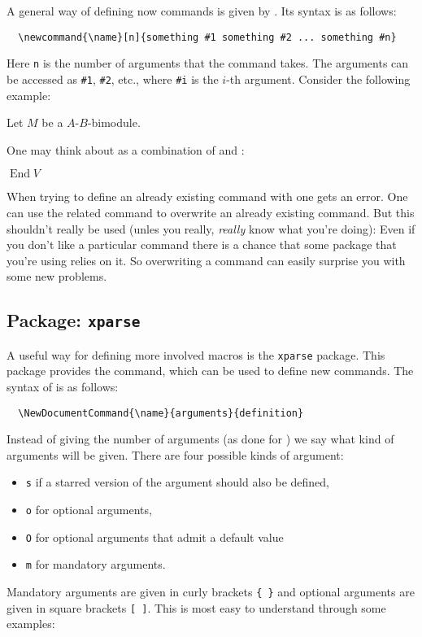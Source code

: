 \documentclass[a4paper, 10pt, abstract=on, headings=standardclasses]{scrartcl}
\begin{document}
A general way of defining now commands is given by .
Its syntax is as follows:
\begin{lstlisting}
  \newcommand{\name}[n]{something #1 something #2 ... something #n}
\end{lstlisting}
Here \texttt{n} is the number of arguments that the command takes.
The arguments can be accessed as \texttt{\#1}, \texttt{\#2}, etc., where \texttt{\#i} is the $i$-th argument.
Consider the following example:
\begin{LTXexample}[pos = b]
  \newcommand{\bimodule}[2]{#1-#2-bimodule}
  Let $M$ be a \bimodule{$A$}{$B$}.
\end{LTXexample}
One may think about  as a combination of  and :
\begin{LTXexample}[pos = b]
  \newcommand{\End}{\operatorname{End}}
  $\End V$
\end{LTXexample}

When trying to define an already existing command with  one gets an error.
One can use the related command  to overwrite an already existing command.
But this shouldn’t really be used (unles you really, \emph{really} know what you’re doing):
Even if you don’t like a particular command there is a chance that some package that you’re using relies on it.
So overwriting a command can easily surprise you with some new problems.



\subsection{Package: \texttt{xparse}}

A useful way for defining more involved macros is the \texttt{xparse} package.
This package provides the  command, which can be used to define new commands.
The syntax of  is as follows:
\begin{lstlisting}
  \NewDocumentCommand{\name}{arguments}{definition}
\end{lstlisting}
Instead of giving the number of arguments (as done for ) we say what kind of arguments will be given.
There are four possible kinds of argument:
\begin{itemize}
  \item
    \texttt{s} if a starred version of the argument should also be defined,
  \item
    \texttt{o} for optional arguments,
  \item
    \texttt{O} for optional arguments that admit a default value
  \item 
    \texttt{m} for mandatory arguments.
\end{itemize}
Mandatory arguments are given in curly brackets \texttt{\{ \}} and optional arguments are given in square brackets \texttt{[ ]}.
This is most easy to understand through some examples:
\end{document}
